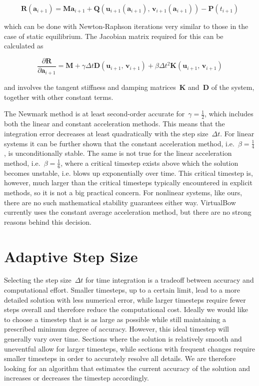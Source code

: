 \begin{equation}
\boldsymbol{R}(\boldsymbol{a}_{i+1}) = \boldsymbol{M}\boldsymbol{a}_{i+1} + \boldsymbol{Q}(\boldsymbol{u}_{i+1}(\boldsymbol{a}_{i+1}),\,\mathbf{v}_{i+1}(\boldsymbol{a}_{i+1})) - \boldsymbol{P}(t_{i+1}) \label{eq:newmark-residual}
\end{equation}

which can be done with Newton-Raphson iterations very similar to those in the case of static equilibrium.
The Jacobian matrix required for this can be calculated as

\begin{equation}
\frac{\partial \boldsymbol{R}}{\partial \boldsymbol{a}_{i+1}} = \boldsymbol{M} + \gamma \Delta t \boldsymbol{D}(\boldsymbol{u}_{i+1},\,\mathbf{v}_{i+1}) + \beta \Delta t^2 \boldsymbol{K}(\boldsymbol{u}_{i+1},\,\mathbf{v}_{i+1})
\end{equation}

and involves the tangent stiffness and damping matrices~$\boldsymbol{K}$ and~$\boldsymbol{D}$ of the system, together with other constant terms.

The Newmark method is at least second-order accurate for~$\gamma = \frac{1}{2}$, which includes both the linear and constant acceleration methods.
This means that the integration error decreases at least quadratically with the step size~$\Delta t$.
For linear systems it can be further shown that the constant acceleration method, i.e.~$\beta = \frac{1}{4}$, is unconditionally stable.
The same is not true for the linear acceleration method, i.e.~$\beta = \frac{1}{6}$, where a critical timestep exists above which the solution becomes unstable, i.e. blows up exponentially over time.
This critical timestep is, however, much larger than the critical timesteps typically encountered in explicit methods, so it is not a big practical concern.
For nonlinear systems, like ours, there are no such mathematical stability guarantees either way.
VirtualBow currently uses the constant average acceleration method, but there are no strong reasons behind this decision.

\newpage
\section{Adaptive Step Size}

Selecting the step size~$\Delta t$ for time integration is a tradeoff between accuracy and computational effort.
Smaller timesteps, up to a certain limit, lead to a more detailed solution with less numerical error, while larger timesteps require fewer steps overall and therefore reduce the computational cost.
Ideally we would like to choose a timestep that is as large as possible while still maintaining a prescribed minimum degree of accuracy.
However, this ideal timestep will generally vary over time.
Sections where the solution is relatively smooth and uneventful allow for larger timesteps, while sections with frequent changes require smaller timesteps in order to accurately resolve all details.
We are therefore looking for an algorithm that estimates the current accuracy of the solution and increases or decreases the timestep accordingly.

